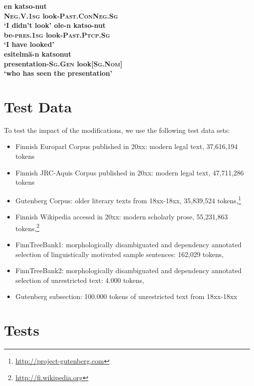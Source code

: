 \documentclass[11pt]{article}
\begin{document}
\begin{exe}
    \ex \label{gloss:pcp-conneg}
    \gll \bf en \bf katso-nut \\
    \small \textsc{Neg.V.1sg} \small look-\textsc{Past.ConNeg.Sg} \\
    \glt `I didn't look'
    \ex \label{gloss:pcp-past}
    \gll \bf ole-n \bf katso-nut \\
    \small be-\textsc{pres.1sg} \small look-\textsc{Past.Ptcp.Sg} \\
    \glt `I have looked' \\
    \ex \label{gloss:pcp-drv}
    \gll \bf esitelmä-n \bf katsonut \\
    \small presentation-\textsc{Sg.Gen} \small look[\textsc{Sg.Nom}] \\
    \glt `who has seen the presentation'
\end{exe}

\section{Test Data}

To test the impact of the modifications, we use the following test data sets:

\begin{itemize}
\item Finnish Europarl Corpus published in 20xx: modern legal text, 37,616,194 tokens \cite{koehn2005europarl}
\item Finnish JRC-Aquis Corpus published in 20xx: modern legal text, 47,711,286 tokens \cite{steinberger2006jrc}
\item Gutenberg Corpus: older literary texts from 18xx-18xx, 35,839,524 tokens,\footnote{\url{http://project-gutenberg.com}}
\item Finnish Wikipedia accessd in 20xx: modern scholarly prose, 55,231,863 tokens,\footnote{\url{http://fi.wikipedia.org}}
\item FinnTreeBank1: morphologically disambiguated and dependency annotated selection of linguistically motivated sample sentences: 
         162,029 tokens, 
\item FinnTreeBank2: morphologically disambiguated and dependency annotated selection of unrestricted text: 
         4.000 tokens, \cite{voutilainen2011finntreebank}
\item Gutenberg subsection: 100.000 tokens of unrestricted text from 18xx-18xx
\end{itemize}

\section{Tests}
\end{document}
